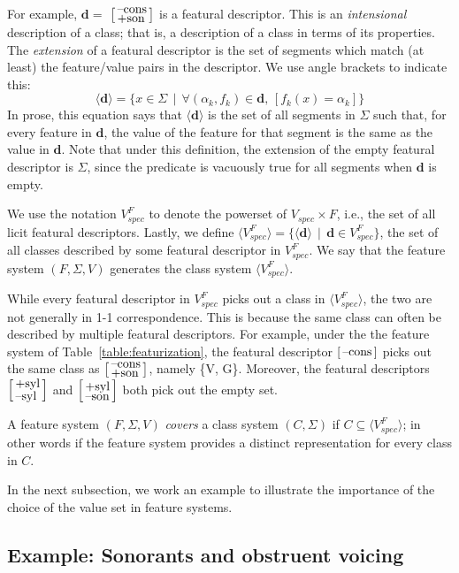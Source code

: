 \documentclass[12pt, oneside]{article}   	%
\newcommand{\featmat}[1]
{$\begin{bsmallmatrix*}[l]\text{\normalsize #1}\end{bsmallmatrix*}$}
\newcommand{\featmattwo}[2]{$\begin{bsmallmatrix*}[l]\text{\normalsize #1}\\\text{\normalsize #2}\end{bsmallmatrix*}$}
\begin{document}
For example, $\mathbf{d} =$  \featmattwo{--cons}{+son} is a featural descriptor. This is an \textit{intensional} description of a class; that is, a description of a class in terms of its properties. The \textit{extension} of a featural descriptor is the set of segments which match (at least) the feature/value pairs in the descriptor. We use angle brackets to indicate this:
$$ \big \langle \mathbf{d} \big \rangle = \{x \in \Sigma \, \mid \, \forall (\alpha_k, f_k) \in \mathbf{d} \text{,  } [ f_k(x) = \alpha_k ] \} $$
In prose, this equation says that $\big \langle \mathbf{d} \big \rangle$ is the set of all segments in $\Sigma$ such that, for every feature in $\mathbf{d}$, the value of the feature for that segment is the same as the value in $\mathbf{d}$. Note that under this definition, the extension of the empty featural descriptor is $\Sigma$, since the predicate is vacuously true for all segments when $\mathbf{d}$ is empty. 

We use the notation $V_{spec}^F$ to denote the powerset of $V_{spec} \times F$, i.e., the set of all licit featural descriptors. Lastly, we define $\langle V_{spec}^F \rangle = \{ \langle \mathbf{d} \rangle \, \mid \, \mathbf{d} \in V_{spec}^F \}$, the set of all classes described by some featural descriptor in $V_{spec}^F$. We say that the feature system $(F, \Sigma, V)$ generates the class system $\langle V_{spec}^F \rangle$.

While every featural descriptor in $V_{spec}^F$ picks out a class in $\langle V_{spec}^F \rangle$, the two are not generally in 1-1 correspondence. This is because the same class can often be described by multiple featural descriptors. For example, under the the feature system of Table~\ref{table:featurization}, the featural descriptor \featmat{--cons} picks out the same class as \featmattwo{--cons}{+son}, namely \{V, G\}. Moreover, the featural descriptors \featmattwo{+syl}{--syl} and \featmattwo{+syl}{--son} both pick out the empty set.

A feature system $(F, \Sigma, V)$ \textit{covers} a class system $(C, \Sigma)$ if $C \subseteq \langle V_{spec}^F \rangle$; in other words if the feature system provides a distinct representation for every class in $C$. 

In the next subsection, we work an example to illustrate the importance of the choice of the value set in feature systems.

\subsection{Example: Sonorants and obstruent voicing}
\end{document}
